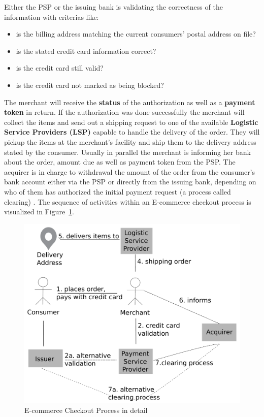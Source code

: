 Either the \gls{PSP} or the issuing bank is validating the correctness of the information with criterias like: \@

\begin{itemize}
    \item is the billing address matching the current consumers' postal address on file?
    \item is the stated credit card information correct?
    \item is the credit card still valid?
    \item is the credit card not marked as being blocked?
\end{itemize}

The merchant will receive the \textbf{status} of the authorization as well as a \textbf{payment token} in return. If the authorization was done successfully the merchant will collect the items and send out a shipping request to one of the available \textbf{Logistic Service Providers (\gls{LSP})} capable to handle the delivery of the order. They will pickup the items at the merchant's facility and ship them to the delivery address stated by the consumer. Usually in parallel the merchant is informing her bank about the order, amount due as well as payment token from the \gls{PSP}. The acquirer is in charge to withdrawal the amount of the order from the consumer's bank account either via the \gls{PSP} or directly from the issuing bank, depending on who of them has authorized the initial payment request (a process called clearing) \citep{VisaPayment2014}. The sequence of activities within an E-commerce checkout process is visualized in Figure~\ref{fig:images_ecommerce_checkout_process}.\@

\begin{figure}[H]
	\centering
		\includegraphics[width=0.8\columnwidth]{images/e-commerce-checkout-process.pdf}
	\caption{E-commerce Checkout Process in detail}
\label{fig:images_ecommerce_checkout_process}
\end{figure}

